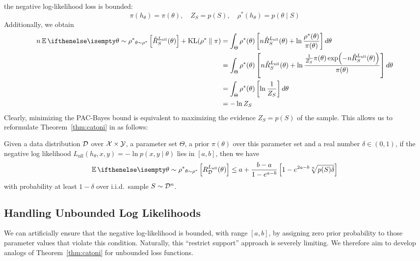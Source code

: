 the negative log-likelihood loss is bounded:
\begin{equation}
  \pi(h_\theta) = \pi(\theta), \quad Z_S = p(S), \quad \rho^*(h_\theta) =
  p(\theta \mid S)
\end{equation}
Additionally, we obtain
\begin{equation}
  \begin{split}
    n \Ev[\theta \sim \rho^*]{\hat{R}_S^{L_\text{nll}}(\theta)} +
    \KL{\rho^*}{\pi}
    &= \int_\Theta \rho^*(\theta) \left[n \hat{R}_S^{L_\text{nll}}(\theta) + \ln
    \frac{\rho^*(\theta)}{\pi(\theta)}\right] d\theta \\
    &= \int_\Theta \rho^*(\theta) \left[n \hat{R}_S^{L_\text{nll}}(\theta) + \ln
    \frac{\frac{1}{Z_S} \pi(\theta) \exp(-n
    \hat{R}_S^{L_\text{nll}}(\theta))}{\pi(\theta)}\right] d\theta \\
    &= \int_\Theta \rho^*(\theta) \left[\ln \frac{1}{Z_S}\right] d\theta \\
    &= -\ln Z_S
  \end{split}
\end{equation}
Clearly, minimizing the PAC-Bayes bound is equivalent to maximizing the evidence
$Z_S = p(S)$ of the sample. This allows us to reformulate
Theorem~\ref{thm:catoni} in as follows:

\begin{corollary}
  \label{cor:catoni}
  Given a data distribution $\mathcal{D}$ over $\mathcal{X} \times \mathcal{Y}$, a parameter set
  $\Theta$, a prior $\pi(\theta)$ over this parameter set and a real number
  $\delta \in (0, 1)$, if the negative log likelihood $L_\text{nll}(h_\theta, x,
  y) = -\ln p(x, y \mid \theta)$ lies in $[a, b]$, then we have
  \begin{equation}
    \Ev[\theta \sim \rho^*]{R_\CD^{L_\text{nll}}(\theta)} \leq a + \frac{b -
    a}{1 - e^{a - b}}\left[1 - e^{2 a - b} \sqrt[n]{p(S) \delta}\right]
  \end{equation}
  with probability at least $1 - \delta$ over i.i.d.\ sample $S \sim \mathcal{D}^n$.
\end{corollary}

\subsection{Handling Unbounded Log Likelihoods}

We can artificially ensure that the negative log-likelihood is bounded, with
range $[a, b]$, by assigning zero prior probability to those parameter values
that violate this condition. Naturally, this ``restrict support'' approach is
severely limiting. We therefore aim to develop analogs of
Theorem~\ref{thm:catoni} for unbounded loss functions.

